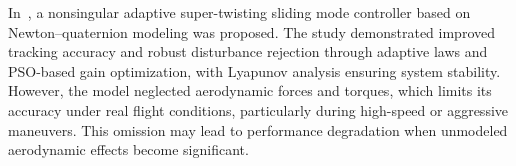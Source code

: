 \noindent In~\cite{abera2024improved,zhao2023sliding}, a nonsingular adaptive super-twisting sliding mode controller based on Newton–quaternion modeling was proposed. The study demonstrated improved tracking accuracy and robust disturbance rejection through adaptive laws and PSO-based gain optimization, with Lyapunov analysis ensuring system stability. However, the model neglected aerodynamic forces and torques, which limits its accuracy under real flight conditions, particularly during high-speed or aggressive maneuvers. This omission may lead to performance degradation when unmodeled aerodynamic effects become significant. %












